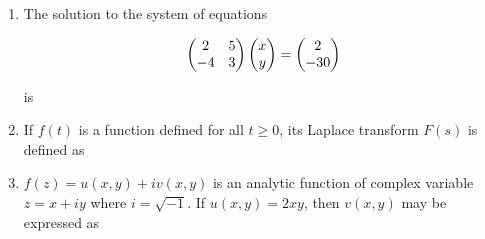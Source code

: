\documentclass[journal,11pt,onecolumn]{IEEEtran}
\begin{document}
\begin{enumerate}

    \item The solution to the system of equations

          \[
              \begin{pmatrix}2 & 5\\-4 & 3\end{pmatrix}\begin{pmatrix}x\\y\end{pmatrix}=\begin{pmatrix}2\\-30\end{pmatrix}
          \]

          is

          \begin{enumerate}

          \end{enumerate}

    \item If $f(t)$ is a function defined for all $t \geq 0$, its Laplace transform $F(s)$ is defined as

          \begin{enumerate}


          \end{enumerate}

    \item $f(z) = u(x,y) + iv(x,y)$ is an analytic function of complex variable $z = x + iy$ where $i = \sqrt{-1}$. If $u(x,y) = 2xy$, then $v(x,y)$ may be expressed as


\end{enumerate}
\end{document}
